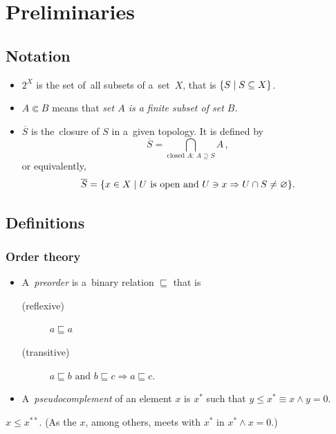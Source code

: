\chapter{Preliminaries}

\section{Notation}

\begin{itemize}
\item $2^X$ is the set of~all subsets of a~set~$X$, that is $\{ S \mid
S\subseteq X \}$.

\item $A \Subset B$ means that {\sl set $A$ is a finite subset of set $B$\/}.

\item $\overline{S}$ is the~closure of $S$ in a~given topology.
It is defined by
\[
  \overline{S} = \bigcap_{ \text{closed } A\colon \, A\supseteq S} A
  \, ,
\]
or equivalently,
\[
  \overline{S} = \{ x \in X \mid U \text{ is open and } U\owns x \Rightarrow U
  \cap S \ne \varnothing \}.
\]

\end{itemize}

\section{Definitions}

\subsection*{Order theory}

\begin{itemize}
\item A~\emph{preorder} is a~binary relation $\sqsubseteq$ that is
  \begin{description}
  \item[(reflexive)] $a \sqsubseteq a$
  \item[(transitive)] $a \sqsubseteq b \text{ and } b \sqsubseteq c \Rightarrow
  a \sqsubseteq c$.
  \end{description}

\item A~\emph{pseudocomplement} of an element $x$ is $x^*$ such that $y \le x^*
\equiv x \wedge y = 0$.
\end{itemize}

\begin{fact}
  $x \le x^{**}$.
  (As the $x$, among others, meets with $x^*$ in $x^* \wedge x = 0$.)
\end{fact}

